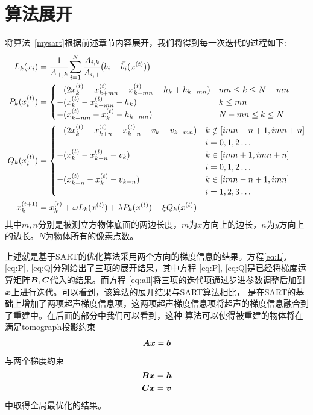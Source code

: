 \section{算法展开}\label{sec:algodetail}
将算法~\ref{mysart}根据前述章节内容展开，我们将得到每一次迭代的过程如下:
\begin{align}
 L_k(x_i) &= \cfrac{1}{A_{+,k}}\sum^N_{i=1}\cfrac{A_{i,k}}{A_{i,+}}\bigl(b_i-\bar{b_i}(x^{(t)})\bigr) \label{eq:L} \\
P_k(x_i^{(t)}) &= \begin{cases}
                            -(2x_k^{(t)} - x_{k+mn}^{(t)} - x_{k-mn}^{(t)} - h_k + h_{k-mn}) & mn \le k \le N-mn \\
                            -(x_k^{(t)} - x_{k+mn}^{(t)} - h_k) &  k\le mn \\
                            -(x_{k-mn}^{(t)} - x_{k}^{(t)} - h_{k-mn}) &  N-mn \le k \le N
                        \end{cases}  \label{eq:P} \\
Q_k(x_i^{(t)}) &= \begin{cases}
                            -(2x_k^{(t)} - x_{k+n}^{(t)} - x_{k-n}^{(t)} - v_k + v_{k-mn}) & k \notin [ imn-n+1, imn+n]
                            \\ &i = 0,1,2\hdots\\
                            -(x_k^{(t)} - x_{k+n}^{(t)} - v_k) & k \in \left[imn+1,imn+n\right] \\ &i = 0,1,2\hdots\\
                            -(x_{k-n}^{(t)} - x_{k}^{(t)} - v_{k-n}) &  k \in [imn-n+1,imn] \\ &i= 1,2,3 \hdots
                        \end{cases} \label{eq:Q} \\
x_k^{(t+1)}&= x_k^{(t)} + \omega L_k(x^{(t)}) + \lambda P_k(x^{(t)}) + \xi Q_k(x^{(t)}) \label{eq:all}
\end{align}
其中$m,n$分别是被测立方物体底面的两边长度，$m$为$x$方向上的边长，$n$为$y$方向上的边长。$N$为物体所有的像素点数。

上述就是基于SART的优化算法采用两个方向的梯度信息的结果。方程\eqref{eq:L}, \eqref{eq:P}, \eqref{eq:Q}分别给出了三项的展开结果，其中方程
\eqref{eq:P}, \eqref{eq:Q}是已经将梯度运算矩阵$\bm{ B},\bm{C}$代入的结果。而方程
\eqref{eq:all}将三项的迭代项通过步进参数调整后加到$\bm{ x}$上进行迭代。可以看到，该算法的展开结果与SART算法相比，
是在SART的基础上增加了两项超声梯度信息项，这两项超声梯度信息项将超声的梯度信息融合到了重建中。在后面的部分中我们可以看到，这种
算法可以使得被重建的物体将在满足tomograph投影约束
\begin{equation*}
\bm{ A}\bm{ x} = \bm{b}
\end{equation*}
与两个梯度约束
\begin{align*}
\bm{ B}\bm{ x} &= \bm{ h} \\
\bm{C}\bm{ x} &= \bm{ v}
\end{align*}
中取得全局最优化的结果。
